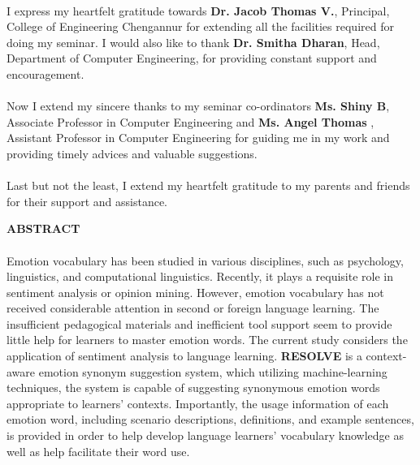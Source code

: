 \documentclass[a4paper,12pt,oneside]{article}
\begin{document}
\paragraph{}
I express my heartfelt gratitude towards \textbf{Dr. Jacob Thomas V.}, Principal, College
of Engineering Chengannur for extending all the facilities required for doing my seminar.
I would also like to thank \textbf{Dr. Smitha Dharan}, Head, Department of Computer
Engineering, for providing constant support and encouragement.
\paragraph{}
Now I extend my sincere thanks to my seminar co-ordinators \textbf{Ms. Shiny B}, Associate
Professor in Computer Engineering and \textbf{Ms. Angel Thomas} , Assistant
Professor in Computer Engineering for guiding me in my work and providing timely
advices and valuable suggestions.
\paragraph{}
Last but not the least, I extend my heartfelt gratitude to my parents and friends for
their support and assistance.	

\newpage
\begin{center}
\large{\textbf{ABSTRACT}}
\end{center}
\vspace{4ex}
\paragraph{}
Emotion vocabulary has been studied in various disciplines, such as psychology, linguistics, and computational linguistics. Recently, it plays a requisite role in sentiment analysis or opinion mining. However, emotion vocabulary has not received considerable attention in second or foreign language learning. The insufficient pedagogical materials and inefficient tool support seem to provide little help for learners to master emotion words. The current study considers the application of sentiment analysis to language learning. \textbf{RESOLVE} is a context-aware emotion synonym suggestion system, which utilizing machine-learning techniques, the system is capable of suggesting synonymous emotion words appropriate to learners’ contexts. Importantly, the usage information of each emotion word, including scenario descriptions, definitions, and example sentences, is provided in order to help develop language learners’ vocabulary knowledge as well as help facilitate their word use. 
\end{document}
